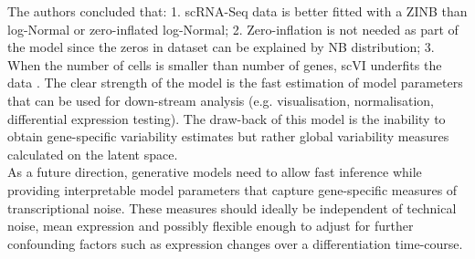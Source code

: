 The authors concluded that: 1. scRNA-Seq data is better fitted with a ZINB than log-Normal or zero-inflated log-Normal; 2. Zero-inflation is not needed as part of the model since the zeros in dataset can be explained by NB distribution; 3. When the number of cells is smaller than number of genes, scVI underfits the data \citep{Lopez2018}. The clear strength of the model is the fast estimation of model parameters that can be used for down-stream analysis (e.g. visualisation, normalisation, differential expression testing). The draw-back of this model is the inability to obtain gene-specific variability estimates but rather global variability measures calculated on the latent space. \\

As a future direction, generative models need to allow fast inference while providing interpretable model parameters that capture gene-specific measures of transcriptional noise. These measures should ideally be independent of technical noise, mean expression and possibly flexible enough to adjust for further confounding factors such as expression changes over a differentiation time-course. 
 

